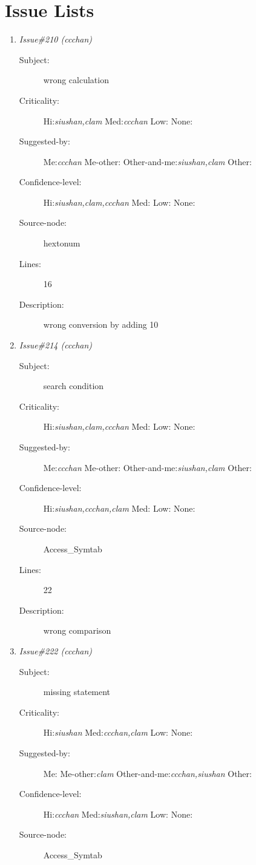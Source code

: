 \section{Issue Lists}
\begin{enumerate}
\item {\it Issue\#210 (ccchan)}
\begin{description}
\item [Subject:] wrong calculation
\item [Criticality:] Hi:{\it siushan,clam} Med:{\it ccchan} Low:{\it } None:{\it }
\item [Suggested-by:] Me:{\it ccchan} Me-other:{\it } Other-and-me:{\it siushan,clam} Other:{\it }
\item [Confidence-level:] Hi:{\it siushan,clam,ccchan} Med:{\it } Low:{\it } None:{\it }
\item [Source-node:] hextonum

\item [Lines:] 16

\item [Description:] wrong conversion by adding 10
\end{description}
\item {\it Issue\#214 (ccchan)}
\begin{description}
\item [Subject:] search condition
\item [Criticality:] Hi:{\it siushan,clam,ccchan} Med:{\it } Low:{\it } None:{\it }
\item [Suggested-by:] Me:{\it ccchan} Me-other:{\it } Other-and-me:{\it siushan,clam} Other:{\it }
\item [Confidence-level:] Hi:{\it siushan,ccchan,clam} Med:{\it } Low:{\it } None:{\it }
\item [Source-node:] Access\_Symtab

\item [Lines:] 22

\item [Description:] wrong comparison
\end{description}
\item {\it Issue\#222 (ccchan)}
\begin{description}
\item [Subject:] missing statement
\item [Criticality:] Hi:{\it siushan} Med:{\it ccchan,clam} Low:{\it } None:{\it }
\item [Suggested-by:] Me:{\it } Me-other:{\it clam} Other-and-me:{\it ccchan,siushan} Other:{\it }
\item [Confidence-level:] Hi:{\it ccchan} Med:{\it siushan,clam} Low:{\it } None:{\it }
\item [Source-node:] Access\_Symtab


\end{description}
\end{enumerate}
